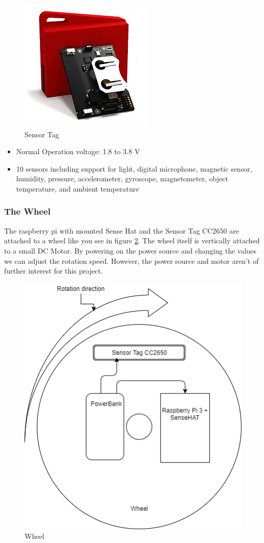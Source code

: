 \documentclass[12pt]{article}
\begin{document}
\begin{figure}[H]
	\includegraphics[width=0.5\linewidth]{CC2650.jpg}
	\centering
	\caption{Sensor Tag}
	\label{fig:cc2650}
\end{figure}


\begin{itemize}
	\item Normal Operation voltage: 1.8 to 3.8 V
	\item 10 sensors including support for light, digital microphone, magnetic sensor, humidity, pressure, accelerometer, gyroscope, magnetometer, object temperature, and ambient temperature
\end{itemize}

\subsubsection{The Wheel}
The raspberry pi with mounted Sense Hat and the Sensor Tag CC2650 are attached to a wheel like you see in figure \ref{fig:wheel}. The wheel itself is vertically attached to a small DC Motor. By powering on the power source and changing the values we can adjust the rotation speed. However, the power source and motor aren't of further interest for this project.  

\begin{figure}[H]
	\includegraphics[width=0.7\linewidth]{wheel}
	\centering
	\caption{Wheel}
	\label{fig:wheel}
\end{figure}
\end{document}
